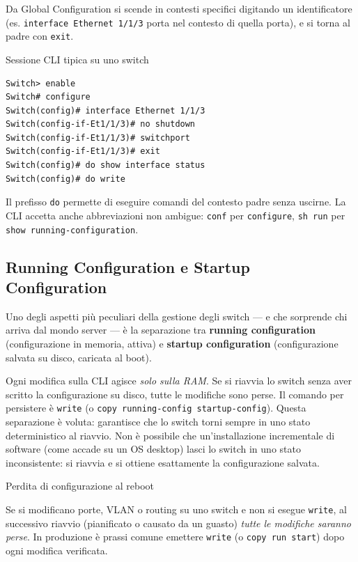 \documentclass[
  italian,
  openany]{book}
\begin{document}
Da Global Configuration si scende in contesti specifici digitando un
identificatore (es. \texttt{interface\ Ethernet\ 1/1/3} porta nel
contesto di quella porta), e si torna al padre con \texttt{exit}.

\begin{callouttip}{Sessione CLI tipica su uno switch}

\begin{verbatim}
Switch> enable
Switch# configure
Switch(config)# interface Ethernet 1/1/3
Switch(config-if-Et1/1/3)# no shutdown
Switch(config-if-Et1/1/3)# switchport
Switch(config-if-Et1/1/3)# exit
Switch(config)# do show interface status
Switch(config)# do write
\end{verbatim}

Il prefisso \texttt{do} permette di eseguire comandi del contesto padre
senza uscirne. La CLI accetta anche abbreviazioni non ambigue:
\texttt{conf} per \texttt{configure}, \texttt{sh\ run} per
\texttt{show\ running-configuration}.

\end{callouttip}

\subsection{Running Configuration e Startup
Configuration}\label{running-configuration-e-startup-configuration}

Uno degli aspetti più peculiari della gestione degli switch --- e che
sorprende chi arriva dal mondo server --- è la separazione tra
\textbf{running configuration} (configurazione in memoria, attiva) e
\textbf{startup configuration} (configurazione salvata su disco,
caricata al boot).

Ogni modifica sulla CLI agisce \emph{solo sulla RAM}. Se si riavvia lo
switch senza aver scritto la configurazione su disco, tutte le modifiche
sono perse. Il comando per persistere è \texttt{write} (o
\texttt{copy\ running-config\ startup-config}). Questa separazione è
voluta: garantisce che lo switch torni sempre in uno stato
deterministico al riavvio. Non è possibile che un'installazione
incrementale di software (come accade su un OS desktop) lasci lo switch
in uno stato inconsistente: si riavvia e si ottiene esattamente la
configurazione salvata.

\begin{calloutwarning}{Perdita di configurazione al reboot}

Se si modificano porte, VLAN o routing su uno switch e non si esegue
\texttt{write}, al successivo riavvio (pianificato o causato da un
guasto) \emph{tutte le modifiche saranno perse}. In produzione è prassi
comune emettere \texttt{write} (o \texttt{copy\ run\ start}) dopo ogni
modifica verificata.

\end{calloutwarning}
\end{document}
